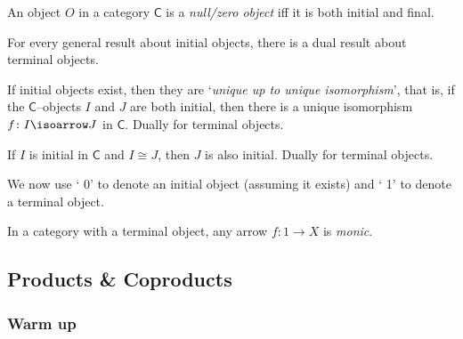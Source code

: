 \begin{df}
	An object $O$ in a category $\mathsf{C}$ is a \textit{null/zero object}  iff it is both initial and final.	
\end{df}



For every general result about initial objects, 
there is a dual result about terminal objects.



\begin{thm}
	If initial objects exist, 
	then they are `\textit{unique up to unique isomorphism}', 
	that is, 
	if the $\mathsf{C}$--objects $I$ and $J$ are both initial, 
	then there is a unique isomorphism $f \colon I \isoarrow J$ in $\mathsf{C}$. 
	Dually for terminal objects.
\end{thm}




\begin{thm}
	If $I$ is initial in $\mathsf{C}$ and $I \cong J$, 
	then $J$ is also initial. 
	Dually for terminal objects.
\end{thm}


\begin{df}
	We now use `{\color{purple} 0}' to denote an initial object (assuming it exists)  and `{\color{purple} 1}' to denote a terminal object.
\end{df}



\begin{prop}
	In a category with a terminal object, 
	any arrow $f \colon 1 \to X$ is \textit{monic}.
\end{prop}





\subsection{Products \& Coproducts}



\subsubsection{Warm up}



\subsubsection{}


